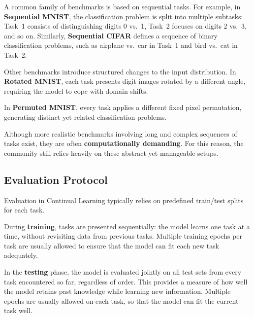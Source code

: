 \begin{compactitemize}
    \item A common family of benchmarks is based on sequential tasks. For example, in \textbf{Sequential
    MNIST}, the classification problem is split into multiple subtasks: Task~1 consists of
    distinguishing digits 0 vs.\ 1, Task~2 focuses on digits 2 vs.\ 3, and so on. Similarly,
    \textbf{Sequential CIFAR} defines a sequence of binary classification problems, such as
    airplane vs.\ car in Task~1 and bird vs.\ cat in Task~2.
    
    \item Other benchmarks introduce structured changes to the input distribution. In \textbf{Rotated
    MNIST}, each task presents digit images rotated by a different angle, requiring the model
    to cope with domain shifts.
    
    \item In \textbf{Permuted MNIST}, every task applies a different fixed pixel permutation, generating
    distinct yet related classification problems.
\end{compactitemize}

Although more realistic benchmarks involving long and complex sequences of tasks exist, they
are often \textbf{computationally demanding}. For this reason, the community still relies heavily on
these abstract yet manageable setups.

\subsection{Evaluation Protocol}
Evaluation in Continual Learning typically relies on predefined train/test splits for each
task.

\begin{compactitemize}
    \item During \textbf{training}, tasks are presented sequentially: the model learns one task at a time,
    without revisiting data from previous tasks. Multiple training epochs per task are usually
    allowed to ensure that the model can fit each new task adequately.

    \item In the \textbf{testing} phase, the model is evaluated jointly on all test sets from every task
    encountered so far, regardless of order. This provides a measure of how well the model retains
    past knowledge while learning new information. Multiple epochs are usually allowed on each
    task, so that the model can fit the current task well.

\end{compactitemize}

